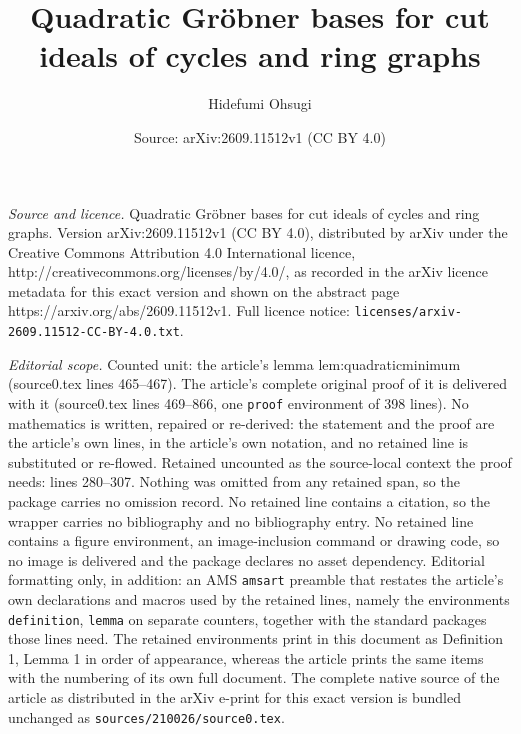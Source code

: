 \documentclass[10pt,a4paper]{amsart}
\title{Quadratic Gr\"obner bases for cut ideals of cycles and ring graphs}
\author{Hidefumi Ohsugi}
\date{Source: arXiv:2609.11512v1 (CC BY 4.0)}
\begin{document}
\maketitle

\noindent\emph{Source and licence.} Quadratic Gr\"obner bases for cut ideals of cycles and ring graphs. Version arXiv:2609.11512v1 (CC BY 4.0), distributed by arXiv under the Creative Commons Attribution 4.0 International licence, http://creativecommons.org/licenses/by/4.0/, as recorded in the arXiv licence metadata for this exact version and shown on the abstract page https://arxiv.org/abs/2609.11512v1. Full licence notice: \texttt{licenses/arxiv-2609.11512-CC-BY-4.0.txt}.\par\smallskip

\noindent\textit{Editorial scope.} Counted unit: the article's lemma lem:quadraticminimum (source0.tex lines 465--467). The article's complete original proof of it is delivered with it (source0.tex lines 469--866, one \texttt{proof} environment of 398 lines). No mathematics is written, repaired or re-derived: the statement and the proof are the article's own lines, in the article's own notation, and no retained line is substituted or re-flowed.  Retained uncounted as the source-local context the proof needs: lines 280--307.  Nothing was omitted from any retained span, so the package carries no omission record.  No retained line contains a citation, so the wrapper carries no bibliography and no bibliography entry.  No retained line contains a figure environment, an image-inclusion command or drawing code, so no image is delivered and the package declares no asset dependency.  Editorial formatting only, in addition: an AMS \texttt{amsart} preamble that restates the article's own declarations and macros used by the retained lines, namely the environments \texttt{definition}, \texttt{lemma} on separate counters, together with the standard packages those lines need.  The retained environments print in this document as Definition 1, Lemma 1 in order of appearance, whereas the article prints the same items with the numbering of its own full document.  The complete native source of the article as distributed in the arXiv e-print for this exact version is bundled unchanged as \texttt{sources/210026/source0.tex}.
\end{document}
